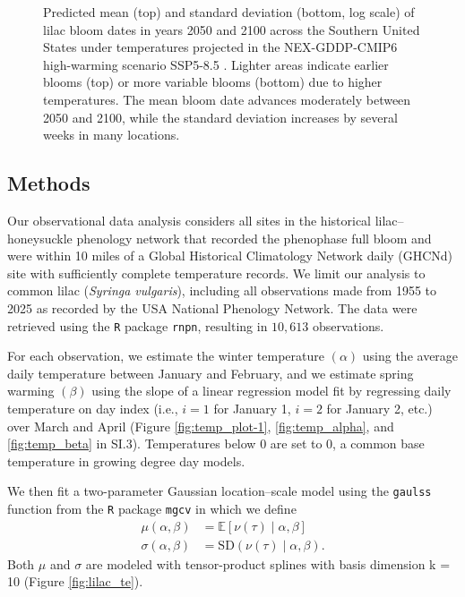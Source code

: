 \documentclass[
]{article}
\begin{document}
{\begin{figure}
     \caption{Predicted mean (top) and standard deviation (bottom, log scale) of lilac bloom dates in years 2050 and 2100 across the Southern United States under temperatures projected in the NEX-GDDP-CMIP6  high-warming scenario SSP5-8.5 \citep{thrasher2022nasa}. Lighter areas indicate earlier blooms (top) or more variable blooms (bottom) due to higher temperatures. The mean bloom date advances moderately between 2050 and 2100, while the standard deviation increases by several weeks in many locations.}
    \label{fig:forecast_south}
\end{figure}

\subsection{Methods}\label{methods}

Our observational data analysis considers all sites in the historical lilac--honeysuckle phenology network \citep{rosemartin2015lilac} that recorded the phenophase full bloom and were within 10 miles of a Global Historical Climatology Network daily (GHCNd)  site with sufficiently complete temperature records. We limit our analysis to common lilac (\textit{Syringa vulgaris}), including all observations made from 1955 to 2025 as recorded by the USA National Phenology Network. The data were retrieved using the \texttt{R} package \texttt{rnpn}, resulting in \(10,613\) observations. 

For each observation, we estimate the winter temperature \((\alpha)\) using the average daily temperature between January and February, and we estimate spring warming \((\beta)\) using the slope of a linear regression model fit by regressing daily temperature on day index (i.e., $i=1$ for January 1, $i=2$ for January 2, etc.) over March and April (Figure \ref{fig:temp_plot-1}, \ref{fig:temp_alpha}, and \ref{fig:temp_beta} in SI.3). Temperatures below \(0\) are set to \(0\), a common base temperature in growing degree day models. 

We then fit a two-parameter Gaussian location--scale model using the \texttt{gaulss} function from the \texttt{R} package \texttt{mgcv} in which we define 
\begin{align*}
 \mu(\alpha,\beta)&=\mathbb{E}[\nu(\tau) \mid \alpha,\beta] \\[1em]
 \sigma(\alpha,\beta)&=\mathrm{SD}(\nu(\tau) \mid \alpha,\beta).
 \end{align*} 
 Both \(\mu\) and \(\sigma\) are modeled with tensor-product splines with basis dimension k = 10 (Figure \ref{fig:lilac_te}). 
 
}
\end{document}
